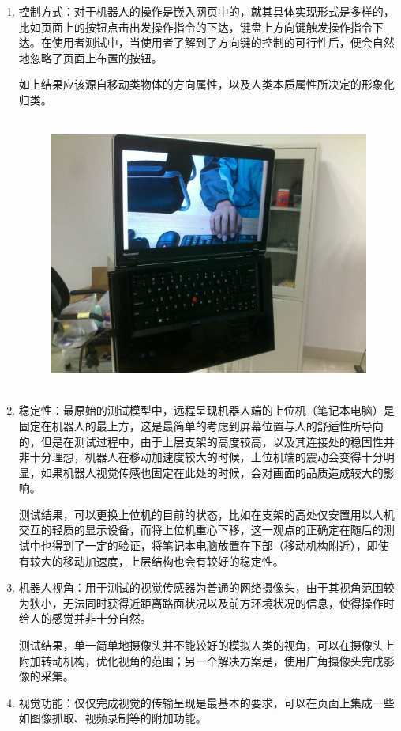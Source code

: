 \begin{enumerate}

\item 控制方式：对于机器人的操作是嵌入网页中的，就其具体实现形式是多样的，比如页面上的按钮点击出发操作指令的下达，键盘上方向键触发操作指令下达。在使用者测试中，当使用者了解到了方向键的控制的可行性后，便会自然地忽略了页面上布置的按钮。

如上结果应该源自移动类物体的方向属性，以及人类本质属性所决定的形象化归类。

\begin{figure}[bht]

  \centering

  \includegraphics[height= 9cm]{Figures/control.pdf}

\end{figure}


\item 稳定性：最原始的测试模型中，远程呈现机器人端的上位机（笔记本电脑）是固定在机器人的最上方，这是最简单的考虑到屏幕位置与人的舒适性所导向的，但是在测试过程中，由于上层支架的高度较高，以及其连接处的稳固性并非十分理想，机器人在移动加速度较大的时候，上位机端的震动会变得十分明显，如果机器人视觉传感也固定在此处的时候，会对画面的品质造成较大的影响。

测试结果，可以更换上位机的目前的状态，比如在支架的高处仅安置用以人机交互的轻质的显示设备，而将上位机重心下移，这一观点的正确定在随后的测试中也得到了一定的验证，将笔记本电脑放置在下部（移动机构附近），即使有较大的移动加速度，上层结构也会有较好的稳定性。

\item 机器人视角：用于测试的视觉传感器为普通的网络摄像头，由于其视角范围较为狭小，无法同时获得近距离路面状况以及前方环境状况的信息，使得操作时给人的感觉并非十分自然。

测试结果，单一简单地摄像头并不能较好的模拟人类的视角，可以在摄像头上附加转动机构，优化视角的范围；另一个解决方案是，使用广角摄像头完成影像的采集。

\item 视觉功能：仅仅完成视觉的传输呈现是最基本的要求，可以在页面上集成一些如图像抓取、视频录制等的附加功能。

\end{enumerate}
        
